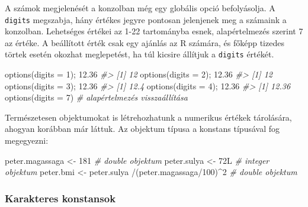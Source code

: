 \documentclass[
]{book}
\newenvironment{Shaded}{\begin{snugshade}}{\end{snugshade}}
\newcommand{\AttributeTok}[1]{\textcolor[rgb]{0.77,0.63,0.00}{#1}}
\newcommand{\CommentTok}[1]{\textcolor[rgb]{0.56,0.35,0.01}{\textit{#1}}}
\newcommand{\DecValTok}[1]{\textcolor[rgb]{0.00,0.00,0.81}{#1}}
\newcommand{\FloatTok}[1]{\textcolor[rgb]{0.00,0.00,0.81}{#1}}
\newcommand{\FunctionTok}[1]{\textcolor[rgb]{0.00,0.00,0.00}{#1}}
\newcommand{\NormalTok}[1]{#1}
\newcommand{\OtherTok}[1]{\textcolor[rgb]{0.56,0.35,0.01}{#1}}
\newcommand{\SpecialCharTok}[1]{\textcolor[rgb]{0.00,0.00,0.00}{#1}}
\begin{document}
A számok megjelenését a konzolban még egy globális opció befolyásolja. A \texttt{digits} megszabja, hány értékes jegyre pontosan jelenjenek meg a számaink a konzolban. Lehetséges értékei az 1-22 tartományba esnek, alapértelmezés szerint 7 az értéke. A beállított érték csak egy ajánlás az R számára, és főképp tizedes törtek esetén okozhat meglepetést, ha túl kicsire állítjuk a \texttt{digits} értékét.

\begin{Shaded}
\begin{Highlighting}[]
\FunctionTok{options}\NormalTok{(}\AttributeTok{digits =} \DecValTok{1}\NormalTok{); }\FloatTok{12.36}
\CommentTok{\#\textgreater{} [1] 12}
\FunctionTok{options}\NormalTok{(}\AttributeTok{digits =} \DecValTok{2}\NormalTok{); }\FloatTok{12.36}
\CommentTok{\#\textgreater{} [1] 12}
\FunctionTok{options}\NormalTok{(}\AttributeTok{digits =} \DecValTok{3}\NormalTok{); }\FloatTok{12.36}
\CommentTok{\#\textgreater{} [1] 12.4}
\FunctionTok{options}\NormalTok{(}\AttributeTok{digits =} \DecValTok{4}\NormalTok{); }\FloatTok{12.36}
\CommentTok{\#\textgreater{} [1] 12.36}
\FunctionTok{options}\NormalTok{(}\AttributeTok{digits =} \DecValTok{7}\NormalTok{)        }\CommentTok{\# alapértelmezés visszaállítása}
\end{Highlighting}
\end{Shaded}

Természetesen objektumokat is létrehozhatunk a numerikus értékek tárolására, ahogyan korábban már láttuk. Az objektum típusa a konstans típusával fog megegyezni:

\begin{Shaded}
\begin{Highlighting}[]
\NormalTok{peter.magassaga }\OtherTok{\textless{}{-}} \DecValTok{181}                                  \CommentTok{\# double objektum}
\NormalTok{peter.sulya     }\OtherTok{\textless{}{-}}\NormalTok{ 72L                                  }\CommentTok{\# integer objektum}
\NormalTok{peter.bmi       }\OtherTok{\textless{}{-}}\NormalTok{ peter.sulya }\SpecialCharTok{/}\NormalTok{(peter.magassaga}\SpecialCharTok{/}\DecValTok{100}\NormalTok{)}\SpecialCharTok{\^{}}\DecValTok{2} \CommentTok{\# double objektum}
\end{Highlighting}
\end{Shaded}

\hypertarget{karakteres-konstansok}{%
\subsubsection{Karakteres konstansok}\label{karakteres-konstansok}}
\end{document}
